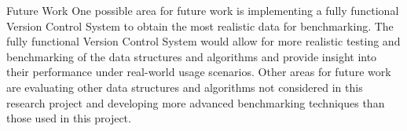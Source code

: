 \documentclass[a4paper,12pt]{article}
\makeatletter
\renewcommand{\section}{\needspace{.25\textheight} \@startsection{section}{1}{0mm}
  {\baselineskip}
  {\baselineskip}{\Large\bfseries\scshape}}
\makeatother
\begin{document}
\section{Future Work}
One possible area for future work is implementing a fully functional Version Control System to obtain the most realistic data for benchmarking. The fully functional Version Control System would allow for more realistic testing and benchmarking of the data structures and algorithms and provide insight into their performance under real-world usage scenarios.
Other areas for future work are evaluating other data structures and algorithms not considered in this research project and developing more advanced benchmarking techniques than those used in this project.
\end{document}
